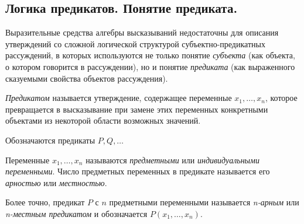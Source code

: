 



\subsection*{Логика предикатов. Понятие предиката.}
Выразительные средства алгебры высказываний недостаточны для описания утверждений со сложной логической структурой субъектно-предикатных рассуждений, в которых используются не только понятие \textit{субъекта} (как объекта, о котором говорится в рассуждении), но и понятие \textit{предиката} (как выраженного сказуемыми свойства объектов рассуждения).

\begin{definition}
    \textit{Предикатом} называется утверждение, содержащее переменные $x_1,\ldots,x_n$, которое превращается в высказывание при замене этих переменных конкретными объектами из некоторой области возможных значений.

    Обозначаются предикаты $P,Q,\ldots$
\end{definition}

\begin{definition}
    Переменные $x_1,\ldots,x_n$ называются \textit{предметными} или \textit{индивидуальными переменными}. Число предметных переменных в предикате называется его \textit{арностью} или \textit{местностью}.

    Более точно, предикат $P$ с $n$ предметными переменными называется \textit{n-арным} или \textit{n-местным предикатом} и обозначается $P(x_1,\ldots,x_n)$.
\end{definition}

